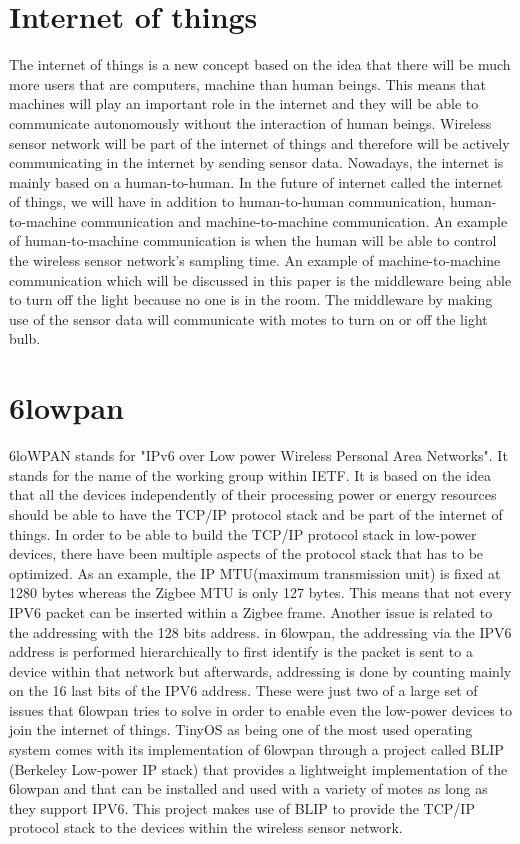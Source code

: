 \documentclass[conference]{IEEEtran}
\begin{document}
\section{Internet of things}
The internet of things is a new concept based on the idea that there will be much more users that are computers, machine than human beings. This means that machines will play an important role in the internet and they will be able to communicate autonomously without the interaction of human beings. Wireless sensor network will be part of the internet of things and therefore will be actively communicating in the internet by sending sensor data. Nowadays, the internet is mainly based on a human-to-human. In the future of internet called the internet of things, we will have in addition to human-to-human communication, human-to-machine communication and machine-to-machine communication. An example of human-to-machine communication is when the human will be able to control the wireless sensor network's sampling time. An example of machine-to-machine communication which will be discussed in this paper is the middleware being able to turn off the light because no one is in the room. The middleware by making use of the sensor data will communicate with motes to turn on or off the light bulb.
\section{6lowpan}
6loWPAN stands for  "IPv6 over Low power Wireless Personal Area Networks". It stands for the name of the working group within IETF. It is based on the idea that all the devices independently of their processing power or energy resources should be able to have the TCP/IP protocol stack and be part of the internet of things. In order to be able to build the TCP/IP protocol stack in low-power devices, there have been multiple aspects of the protocol stack that has to be optimized. As an example, the IP MTU(maximum transmission unit) is fixed at 1280 bytes whereas the Zigbee MTU is only 127 bytes. This means that not every IPV6 packet can be inserted within a Zigbee frame. Another issue is related to the addressing with the 128 bits address. in 6lowpan, the addressing via the IPV6 address is performed hierarchically to first identify is the packet is sent to a device within that network but afterwards, addressing is done by counting mainly on the 16 last bits of the IPV6 address. These were just two of a large set of issues that 6lowpan tries to solve in order to enable even the low-power devices to join the internet of things. TinyOS as being one of the most used operating system comes with its implementation of 6lowpan through a project called BLIP (Berkeley Low-power IP stack) that provides a lightweight implementation of the 6lowpan and that can be installed and used with a variety of motes as long as they support IPV6. This project makes use of BLIP to provide the TCP/IP protocol stack to the devices within the wireless sensor network.
\end{document}

